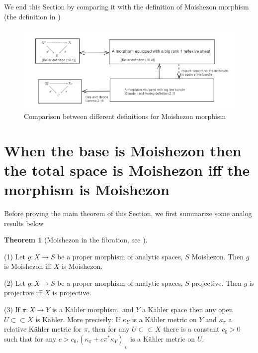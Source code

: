 \documentclass[11pt]{article}
\theoremstyle{definition}
\newtheorem{theorem}{Theorem}
\begin{document}
	We end this Section by comparing it with the definition of Moishezon morphism (the definition in \cite{Moishezonmorphism})
	\begin{figure}[H]
		\centering
		\includegraphics[width=0.85\linewidth]{"Moishezon morphism definition"}
		\caption{Comparison between different definitions for Moishezon morphism}
		\label{fig:moishezon-morphism-definition}
	\end{figure}
	
	\section{When the base is Moishezon then the total space is Moishezon iff the morphism is Moishezon}
	Before proving the main theorem of this Section, we first summarize some analog results below
	
	\begin{theorem}[Moishezon in the fibration, see \cite{Moishezonmorphism,Jean}]~


	(1) Let $g: X \rightarrow S$ be a proper morphism of analytic spaces, $S$ Moishezon. Then $g$ is Moishezon iff $X$ is Moishezon.
	
	(2) Let $g:X\to S$ be a proper morphism of analytic spaces, $S$ projective. Then $g$ is projective iff $X$ is projective.
	
	(3) If $\pi: X \rightarrow Y$ is a Kähler morphism, and $Y$ a Kähler space then any open $U \subset \subset X$ is Kähler. More precisely: If $\kappa_Y$ is a Kähler metric on $Y$ and $\kappa_\pi$ a relative Kähler metric for $\pi$, then for any $U \subset \subset X$ there is a constant $c_0>0$ such that for any $c>c_0$,$\left(\kappa_\pi+c \pi^* \kappa_Y\right)_{\left.\right|_U}$ is a Kähler metric on $U$.

	\end{theorem}
	
\end{document}
